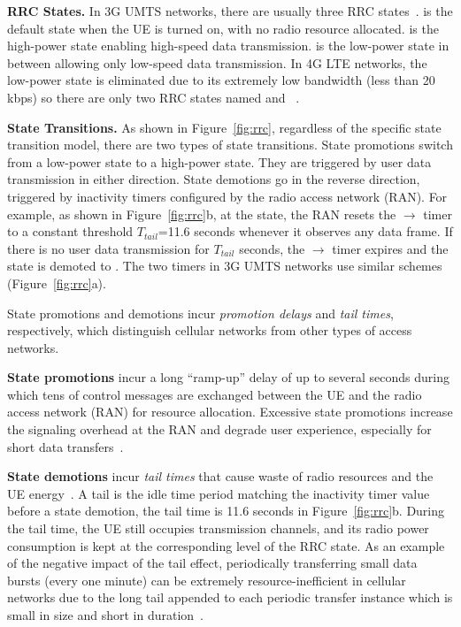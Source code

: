 \textbf{RRC States.} In 3G UMTS networks, there are usually three RRC states~\cite{imc.3g, mobisys.aro}. \RI is the default state when the UE is turned on, with no radio resource allocated. \RD is the high-power state enabling high-speed data transmission. \RF is the low-power state in between allowing only low-speed data transmission. In 4G LTE networks, the low-power state is eliminated due to its extremely low bandwidth (less than 20 kbps) so there are only two RRC states named \RC and \RI~\cite{huang_mobisys12}.

\textbf{State Transitions.}
As shown in Figure~\ref{fig:rrc}, regardless of the specific state transition model, there are two types of state transitions. State promotions switch from a low-power state to a high-power state. They are triggered by user data transmission in either direction. State demotions go in the reverse direction, triggered by inactivity timers configured by the radio access network (RAN). For example, as shown in Figure~\ref{fig:rrc}b, at the \RC state, the RAN resets the \RC$\rightarrow$ \RI timer to a constant threshold $T_{tail}$=11.6 seconds whenever it observes any data frame. If there is no user data transmission for $T_{tail}$ seconds, the \RC$\rightarrow$ \RI timer expires and the state is demoted to \RI. The two timers in 3G UMTS networks use similar schemes (Figure~\ref{fig:rrc}a).

State promotions and demotions incur \emph{promotion delays} and \emph{tail times}, respectively, which distinguish cellular networks from other types of access networks.

\textbf{State promotions} incur a long ``ramp-up'' delay of up to several seconds during which tens of control messages are exchanged between the UE and the radio access network (RAN) for resource allocation. Excessive state promotions increase the signaling overhead at the RAN and degrade user experience, especially for short data transfers~\cite{3gpp:090941, qian10_icnp}.

\textbf{State demotions} incur \emph{tail times} that cause waste of radio resources and the UE energy~\cite{imc.tailender, imc.3g}. A tail is the idle time period matching the inactivity timer value before a state demotion, \eg the tail time is 11.6 seconds in Figure~\ref{fig:rrc}b. During the tail time, the UE still occupies transmission channels, and its radio power consumption is kept at the corresponding level of the RRC state.
As an example of the negative impact of the tail effect, periodically transferring small data bursts (\eg every one minute) can be extremely resource-inefficient in cellular networks due to the long tail appended to each periodic transfer instance which is small in size and short in duration~\cite{qian12_www}.

